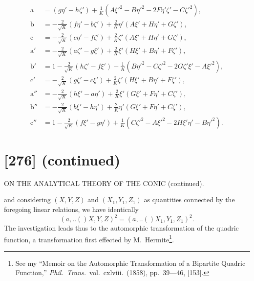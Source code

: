\documentclass[11pt,a4paper]{book}
\providecommand{\qform}[1]{(#1)}
\begin{document}
\begin{align*}
\mathrm{a} &= (g\eta' - h\zeta') + \tfrac{1}{K}(A\xi'^{2} - B\eta'^{2} - 2F\eta'\zeta' - C\zeta'^{2}),\\
\mathrm{b} &= -\tfrac{2}{\sqrt{K}}(f\eta' - b\zeta') + \tfrac{2}{K}\eta'(A\xi' + H\eta' + G\zeta'),\\
\mathrm{c} &= -\tfrac{2}{\sqrt{K}}(c\eta' - f\zeta') + \tfrac{2}{K}\zeta'(A\xi' + H\eta' + G\zeta'),\\
\mathrm{a}' &= -\tfrac{2}{\sqrt{K}}(a\zeta' - g\xi') + \tfrac{2}{K}\xi'(H\xi' + B\eta' + F\zeta'),\\
\mathrm{b}' &= 1 - \tfrac{2}{\sqrt{K}}(h\zeta' - f\xi') + \tfrac{1}{K}(B\eta'^{2} - C\zeta'^{2} - 2G\zeta'\xi' - A\xi'^{2}),\\
\mathrm{c}' &= -\tfrac{2}{\sqrt{K}}(g\zeta' - c\xi') + \tfrac{2}{K}\zeta'(H\xi' + B\eta' + F\zeta'),\\
\mathrm{a}'' &= -\tfrac{2}{\sqrt{K}}(h\xi' - a\eta') + \tfrac{2}{K}\xi'(G\xi' + F\eta' + C\zeta'),\\
\mathrm{b}'' &= -\tfrac{2}{\sqrt{K}}(b\xi' - h\eta') + \tfrac{2}{K}\eta'(G\xi' + F\eta' + C\zeta'),\\
\mathrm{c}'' &= 1 - \tfrac{2}{\sqrt{K}}(f\xi' - g\eta') + \tfrac{1}{K}(C\zeta'^{2} - A\xi'^{2} - 2H\xi'\eta' - B\eta'^{2}).
\end{align*}

\newpage
\section*{[276] (continued)}
\begin{center}
{\large ON THE ANALYTICAL THEORY OF THE CONIC (continued).}
\end{center}

and considering $(X, Y, Z)$ and $(X_{1}, Y_{1}, Z_{1})$ as quantities connected by the foregoing linear relations, we have identically
\[
(a,..\!\qform{}{X, Y, Z})^{2} = (a,..\!\qform{}{X_{1}, Y_{1}, Z_{1}})^{2}.
\]
The investigation leads thus to the automorphic transformation of the quadric function, a transformation first effected by M.~Hermite\footnote{See my ``Memoir on the Automorphic Transformation of a Bipartite Quadric Function,'' \textit{Phil.\ Trans.}\ vol.~cxlviii.\ (1858), pp.~39---46, [153].}.
\end{document}
